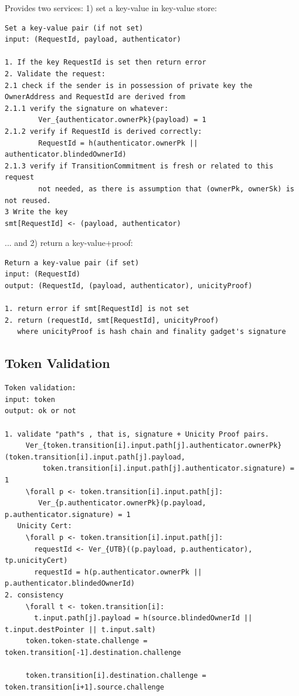 Provides two services: 1) set a key-value in key-value store:

\begin{lstlisting}
Set a key-value pair (if not set)
input: (RequestId, payload, authenticator)

1. If the key RequestId is set then return error
2. Validate the request:
2.1 check if the sender is in possession of private key the OwnerAddress and RequestId are derived from
2.1.1 verify the signature on whatever:
        Ver_{authenticator.ownerPk}(payload) = 1
2.1.2 verify if RequestId is derived correctly:
        RequestId = h(authenticator.ownerPk || authenticator.blindedOwnerId)
2.1.3 verify if TransitionCommitment is fresh or related to this request
        not needed, as there is assumption that (ownerPk, ownerSk) is not reused.
3 Write the key
smt[RequestId] <- (payload, authenticator)
\end{lstlisting}

... and 2) return a key-value+proof:

\begin{lstlisting}
Return a key-value pair (if set)
input: (RequestId)
output: (RequestId, (payload, authenticator), unicityProof)

1. return error if smt[RequestId] is not set
2. return (requestId, smt[RequestId], unicityProof)
   where unicityProof is hash chain and finality gadget's signature
\end{lstlisting}



\subsection{Token Validation}

\begin{lstlisting}
Token validation:
input: token
output: ok or not

1. validate "path"s , that is, signature + Unicity Proof pairs.
     Ver_{token.transition[i].input.path[j].authenticator.ownerPk}(token.transition[i].input.path[j].payload,
         token.transition[i].input.path[j].authenticator.signature) = 1
     \forall p <- token.transition[i].input.path[j]:
        Ver_{p.authenticator.ownerPk}(p.payload, p.authenticator.signature) = 1
   Unicity Cert:
     \forall p <- token.transition[i].input.path[j]:
       requestId <- Ver_{UTB}((p.payload, p.authenticator), tp.unicityCert)
       requestId = h(p.authenticator.ownerPk || p.authenticator.blindedOwnerId)
2. consistency
     \forall t <- token.transition[i]:
       t.input.path[j].payload = h(source.blindedOwnerId || t.input.destPointer || t.input.salt)
     token.token-state.challenge = token.transition[-1].destination.challenge

     token.transition[i].destination.challenge = token.transition[i+1].source.challenge


\end{lstlisting}
